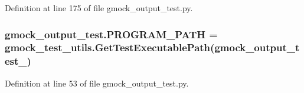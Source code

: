 Definition at line 175 of file gmock\+\_\+output\+\_\+test.\+py.

\subsubsection[{\texorpdfstring{P\+R\+O\+G\+R\+A\+M\+\_\+\+P\+A\+TH}{PROGRAM_PATH}}]{\setlength{\rightskip}{0pt plus 5cm}gmock\+\_\+output\+\_\+test.\+P\+R\+O\+G\+R\+A\+M\+\_\+\+P\+A\+TH = {\bf gmock\+\_\+test\+\_\+utils.\+Get\+Test\+Executable\+Path}(\textquotesingle{}gmock\+\_\+output\+\_\+test\+\_\+\textquotesingle{})}\hypertarget{namespacegmock__output__test_a03aac0fac952a0b3648340f529af7f59}{}\label{namespacegmock__output__test_a03aac0fac952a0b3648340f529af7f59}


Definition at line 53 of file gmock\+\_\+output\+\_\+test.\+py.

